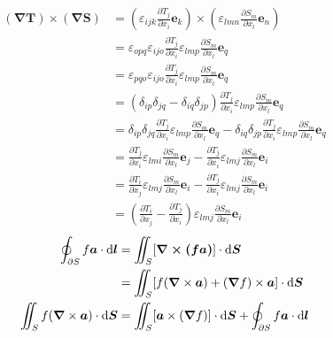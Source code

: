 \begin{align*}
    \left(\boldsymbol{\nabla}\boldsymbol{T}\right)\times(\boldsymbol{\nabla}\boldsymbol{S})&=\left(\varepsilon_{ijk}\frac{\partial T_j}{\partial x_i}\boldsymbol{e}_k\right)\times\left(\varepsilon_{lmn}\frac{\partial S_m}{\partial x_l}\boldsymbol{e}_n\right)\\
    &=\varepsilon_{opq}\varepsilon_{ijo}\frac{\partial T_j}{\partial x_i}\varepsilon_{lmp}\frac{\partial S_m}{\partial x_l}\boldsymbol{e}_q\\
    &=\varepsilon_{pqo}\varepsilon_{ijo}\frac{\partial T_j}{\partial x_i}\varepsilon_{lmp}\frac{\partial S_m}{\partial x_l}\boldsymbol{e}_q\\
    &=(\delta_{ip}\delta_{jq}-\delta_{iq}\delta_{jp})\frac{\partial T_j}{\partial x_i}\varepsilon_{lmp}\frac{\partial S_m}{\partial x_l}\boldsymbol{e}_q\\
    &=\delta_{ip}\delta_{jq}\frac{\partial T_j}{\partial x_i}\varepsilon_{lmp}\frac{\partial S_m}{\partial x_l}\boldsymbol{e}_q-\delta_{iq}\delta_{jp}\frac{\partial T_j}{\partial x_i}\varepsilon_{lmp}\frac{\partial S_m}{\partial x_l}\boldsymbol{e}_q\\
    &=\frac{\partial T_j}{\partial x_i}\varepsilon_{lmi}\frac{\partial S_m}{\partial x_l}\boldsymbol{e}_j-\frac{\partial T_j}{\partial x_i}\varepsilon_{lmj}\frac{\partial S_m}{\partial x_l}\boldsymbol{e}_i\\
    &=\frac{\partial T_i}{\partial x_j}\varepsilon_{lmj}\frac{\partial S_m}{\partial x_l}\boldsymbol{e}_i-\frac{\partial T_j}{\partial x_i}\varepsilon_{lmj}\frac{\partial S_m}{\partial x_l}\boldsymbol{e}_i\\
    &=\left(\frac{\partial T_i}{\partial x_j}-\frac{\partial T_j}{\partial x_i}\right)\varepsilon_{lmj}\frac{\partial S_m}{\partial x_l}\boldsymbol{e}_i
\end{align*}
\begin{align*}
    \oint_{\partial S} f\boldsymbol{a}\cdot\dif \boldsymbol{l}&=\iint_S[\boldsymbol{\nabla\times(f\boldsymbol{a})}]\cdot\dif \boldsymbol{S}\\
    &=\iint_S[f(\boldsymbol{\nabla}\times \boldsymbol{a})+(\boldsymbol{\nabla} f)\times \boldsymbol{a}]\cdot\dif \boldsymbol{S}\\
    \iint_S f(\boldsymbol{\nabla}\times\boldsymbol{a})\cdot\dif \boldsymbol{S}&=\iint_S [\boldsymbol{a}\times(\boldsymbol{\nabla}f)]\cdot\dif \boldsymbol{S}+\oint_{\partial S} f\boldsymbol{a}\cdot\dif \boldsymbol{l}
\end{align*}

